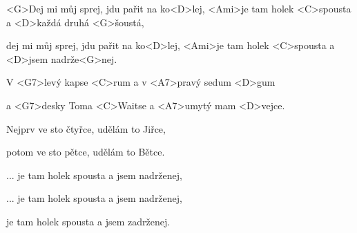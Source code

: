 

\zr
 <G>Dej mi můj sprej, jdu pařit na ko<D>lej,
 <Ami>je tam holek <C>spousta a <D>každá druhá <G>šoustá,
	
 dej mi můj sprej, jdu pařit na ko<D>lej,
 <Ami>je tam holek <C>spousta a <D>jsem nadrže<G>nej.
\kr

\zs
 V <G7>levý kapse <C>rum a v <A7>pravý sedum <D>gum

 a <G7>desky Toma <C>Waitse a <A7>umytý mam <D>vejce.
\ks

\zr \kr
	
\zs
Nejprv ve sto čtyřce, udělám to Jiřce,

potom ve sto pětce, udělám to Bětce.
\ks

\zr

	...	je tam holek spousta a jsem nadrženej,

	...	je tam holek spousta a jsem nadrženej,

	je tam holek spousta a jsem zadrženej.
\kr

\kp
